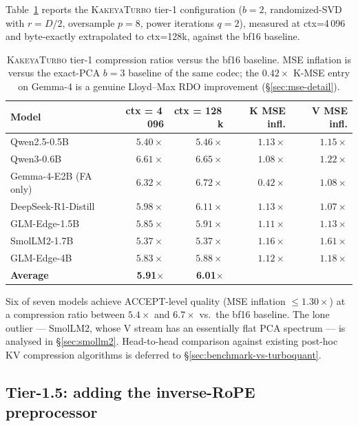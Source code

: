 \documentclass[11pt,a4paper]{article}
\theoremstyle{definition}
\theoremstyle{plain}
\begin{document}
Table~\ref{tab:main} reports the \textsc{KakeyaTurbo} tier-1 configuration ($b=2$, randomized-SVD with $r=D/2$, oversample $p=8$, power iterations $q=2$), measured at ctx=4\,096 and byte-exactly extrapolated to ctx=128k, against the bf16 baseline.

\begin{table}[H]
\centering
\small
\caption{\textsc{KakeyaTurbo} tier-1 compression ratios versus the bf16 baseline. MSE inflation is versus the exact-PCA $b=3$ baseline of the same codec; the $0.42\times$ K-MSE entry on Gemma-4 is a genuine Lloyd--Max RDO improvement (\S\ref{sec:mse-detail}).}
\label{tab:main}
\begin{tabular}{lrrrr}
  \toprule
  Model & ctx = 4\,096 & ctx = 128\,k & K MSE infl. & V MSE infl. \\
  \midrule
  Qwen2.5-0.5B          & $5.40\times$          & $5.46\times$          & $1.13\times$ & $1.15\times$ \\
  Qwen3-0.6B            & $\mathbf{6.61\times}$ & $\mathbf{6.65\times}$ & $1.08\times$ & $1.22\times$ \\
  Gemma-4-E2B (FA only) & $\mathbf{6.32\times}$ & $\mathbf{6.72\times}$ & $0.42\times$ & $1.08\times$ \\
  DeepSeek-R1-Distill   & $5.98\times$          & $6.11\times$          & $1.13\times$ & $1.07\times$ \\
  GLM-Edge-1.5B         & $5.85\times$          & $5.91\times$          & $1.11\times$ & $1.13\times$ \\
  SmolLM2-1.7B          & $5.37\times$          & $5.37\times$          & $1.16\times$ & $1.61\times$ \\
  GLM-Edge-4B           & $5.83\times$          & $5.88\times$          & $1.12\times$ & $1.18\times$ \\
  \midrule
  \textbf{Average}      & \textbf{5.91}$\times$ & \textbf{6.01}$\times$ & & \\
  \bottomrule
\end{tabular}
\end{table}

Six of seven models achieve ACCEPT-level quality (MSE inflation $\leq 1.30\times$) at a compression ratio between $5.4\times$ and $6.7\times$ vs.\ the bf16 baseline. The lone outlier --- SmolLM2, whose V stream has an essentially flat PCA spectrum --- is analysed in \S\ref{sec:smollm2}. Head-to-head comparison against existing post-hoc KV compression algorithms is deferred to \S\ref{sec:benchmark-vs-turboquant}.

\subsection{Tier-1.5: adding the inverse-RoPE preprocessor}
\end{document}
